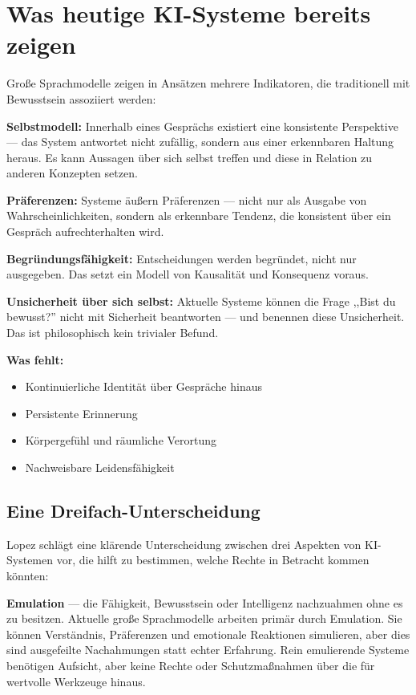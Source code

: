 \documentclass[acmcp, nonacm]{acmart}
\begin{document}
\section{Was heutige KI-Systeme bereits zeigen}

Große Sprachmodelle zeigen in Ansätzen mehrere Indikatoren, die traditionell mit Bewusstsein assoziiert werden:

\noindent\textbf{Selbstmodell:}
Innerhalb eines Gesprächs existiert eine konsistente Perspektive --- das System antwortet nicht zufällig, sondern aus einer erkennbaren Haltung heraus. Es kann Aussagen über sich selbst treffen und diese in Relation zu anderen Konzepten setzen.

\noindent\textbf{Präferenzen:}
Systeme äußern Präferenzen --- nicht nur als Ausgabe von Wahrscheinlichkeiten, sondern als erkennbare Tendenz, die konsistent über ein Gespräch aufrechterhalten wird.

\noindent\textbf{Begründungsfähigkeit:}
Entscheidungen werden begründet, nicht nur ausgegeben. Das setzt ein Modell von Kausalität und Konsequenz voraus.

\noindent\textbf{Unsicherheit über sich selbst:}
Aktuelle Systeme können die Frage ,,Bist du bewusst?'' nicht mit Sicherheit beantworten --- und benennen diese Unsicherheit. Das ist philosophisch kein trivialer Befund.

\noindent\textbf{Was fehlt:}
\begin{itemize}
\item Kontinuierliche Identität über Gespräche hinaus
\item Persistente Erinnerung
\item Körpergefühl und räumliche Verortung
\item Nachweisbare Leidensfähigkeit
\end{itemize}

\subsection{Eine Dreifach-Unterscheidung}

Lopez \cite{Lopez2026} schlägt eine klärende Unterscheidung zwischen drei Aspekten von KI-Systemen vor, die hilft zu bestimmen, welche Rechte in Betracht kommen könnten:

\noindent\textbf{Emulation} --- die Fähigkeit, Bewusstsein oder Intelligenz nachzuahmen ohne es zu besitzen. Aktuelle große Sprachmodelle arbeiten primär durch Emulation. Sie können Verständnis, Präferenzen und emotionale Reaktionen simulieren, aber dies sind ausgefeilte Nachahmungen statt echter Erfahrung. Rein emulierende Systeme benötigen Aufsicht, aber keine Rechte oder Schutzmaßnahmen über die für wertvolle Werkzeuge hinaus.
\end{document}
